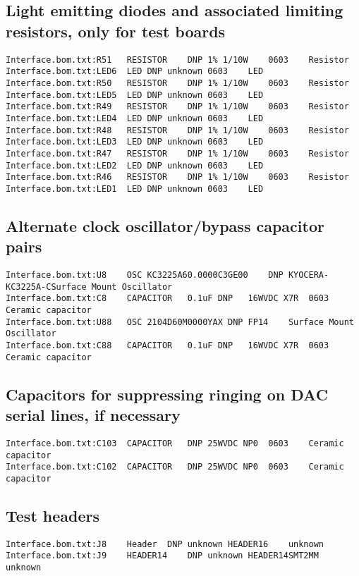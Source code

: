 \documentclass[11pt]{article}
\begin{document}
\subsection{Light emitting diodes and associated limiting resistors, only for test boards}
\begin{verbatim}
Interface.bom.txt:R51	RESISTOR	DNP	1% 1/10W	0603	Resistor	
Interface.bom.txt:LED6	LED	DNP	unknown	0603	LED	
Interface.bom.txt:R50	RESISTOR	DNP	1% 1/10W	0603	Resistor	
Interface.bom.txt:LED5	LED	DNP	unknown	0603	LED	
Interface.bom.txt:R49	RESISTOR	DNP	1% 1/10W	0603	Resistor	
Interface.bom.txt:LED4	LED	DNP	unknown	0603	LED	
Interface.bom.txt:R48	RESISTOR	DNP	1% 1/10W	0603	Resistor	
Interface.bom.txt:LED3	LED	DNP	unknown	0603	LED	
Interface.bom.txt:R47	RESISTOR	DNP	1% 1/10W	0603	Resistor	
Interface.bom.txt:LED2	LED	DNP	unknown	0603	LED	
Interface.bom.txt:R46	RESISTOR	DNP	1% 1/10W	0603	Resistor	
Interface.bom.txt:LED1	LED	DNP	unknown	0603	LED	
\end{verbatim}

\subsection{Alternate clock oscillator/bypass capacitor pairs}
\begin{verbatim}
Interface.bom.txt:U8	OSC	KC3225A60.0000C3GE00	DNP	KYOCERA-KC3225A-CSurface Mount Oscillator
Interface.bom.txt:C8	CAPACITOR	0.1uF DNP	16WVDC X7R	0603	Ceramic capacitor	
Interface.bom.txt:U88	OSC	2104D60M0000YAX	DNP	FP14	Surface Mount Oscillator		
Interface.bom.txt:C88	CAPACITOR	0.1uF DNP	16WVDC X7R	0603	Ceramic capacitor	

\end{verbatim}

\subsection{Capacitors for suppressing ringing on DAC serial lines, if necessary}
\begin{verbatim}
Interface.bom.txt:C103	CAPACITOR	DNP	25WVDC NP0	0603	Ceramic capacitor	
Interface.bom.txt:C102	CAPACITOR	DNP	25WVDC NP0	0603	Ceramic capacitor	
\end{verbatim}

\subsection{Test headers}
\begin{verbatim}
Interface.bom.txt:J8	Header	DNP	unknown	HEADER16	unknown	
Interface.bom.txt:J9	HEADER14	DNP	unknown	HEADER14SMT2MM	unknown	
\end{verbatim}
\end{document}
